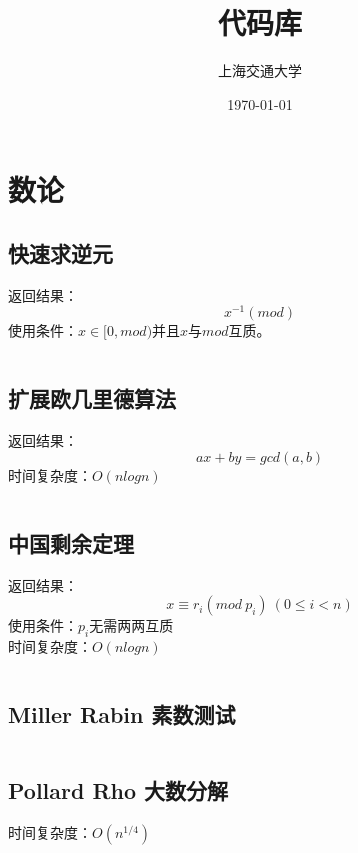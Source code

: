 \documentclass[a4paper]{article}
\title{代码库}
\author{上海交通大学}
\date{\today}
\newcommand{\cppcode}[1]{
    \inputminted[mathescape]{cpp}{source/#1}
}
\begin{document}
\maketitle

\tableofcontents

\clearpage

\section{数论}

\subsection{快速求逆元}

返回结果：$$x^{-1}(mod)$$
\indent 使用条件：$x \in [0, mod)$并且$x$与$mod$互质。

\cppcode{number-theory/inverse.cpp}

\subsection{扩展欧几里德算法}

返回结果：$$ax+by=gcd(a,b)$$
\indent 时间复杂度：$O(nlogn)$

\cppcode{number-theory/extended-euclid.cpp}

\subsection{中国剩余定理}

返回结果：$$x \equiv r_i (mod \ p_i) \ (0 \leq i < n)$$
\indent 使用条件：$p_i$无需两两互质\\
\indent 时间复杂度：$O(nlogn)$

\cppcode{number-theory/chinese-remainder-theorem.cpp}

\subsection{Miller Rabin 素数测试}

\cppcode{number-theory/miller-rabin.cpp}

\subsection{Pollard Rho 大数分解}

时间复杂度：$O(n^{1/4})$

\cppcode{number-theory/pollard-rho.cpp}
\end{document}
